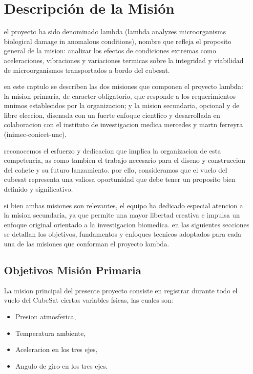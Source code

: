 \chapter{Descripción de la Misión}
el proyecto ha sido denominado lambda (lambda analyzes microorganisms biological damage in anomalous
 conditions), nombre que refleja el proposito general de la mision:
analizar los efectos de condiciones extremas como aceleraciones, vibraciones y variaciones
termicas sobre la integridad y viabilidad de microorganismos transportados a bordo del
cubesat.

en este captulo se describen las dos misiones que componen el proyecto lambda: la
mision primaria, de caracter obligatorio, que responde a los requerimientos mnimos establecidos por
la organizacion; y la mision secundaria, opcional y de libre eleccion, disenada con
un fuerte enfoque cientfico y desarrollada en colaboracion con el instituto de investigacion
medica mercedes y martn ferreyra (inimec-conicet-unc).

reconocemos el esfuerzo y dedicacion que implica la organizacion de esta competencia, as
como tambien el trabajo necesario para el diseno y construccion del cohete y su futuro lanzamiento.
por ello, consideramos que el vuelo del cubesat representa una valiosa oportunidad
que debe tener un proposito bien definido y significativo.

si bien ambas misiones son relevantes, el equipo ha dedicado especial atencion a la mision secundaria,
ya que permite una mayor libertad creativa e impulsa un enfoque original
orientado a la investigacion biomedica. en las siguientes secciones se detallan los objetivos,
fundamentos y enfoques tecnicos adoptados para cada una de las misiones que conforman el
proyecto lambda.

\section{Objetivos Misión Primaria}
La mision principal del presente proyecto consiste en registrar durante todo el vuelo del
CubeSat ciertas variables fsicas, las cuales son:

  \begin{itemize}
    \item Presion atmosferica,
    \item Temperatura ambiente,
    \item Aceleracion en los tres ejes,
    \item Angulo de giro en los tres ejes.
  \end{itemize}

